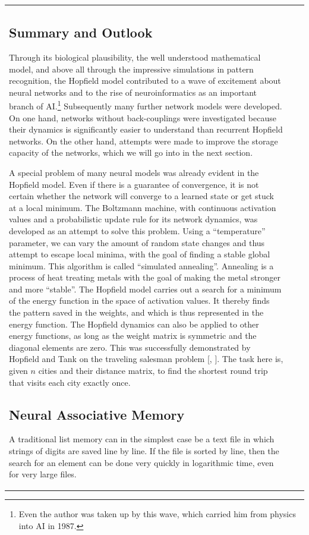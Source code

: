 \documentclass[10pt]{book}
\begin{document}
\begin{center}
\begin{tabular}{|l|l|l|}
\subsection{Summary and Outlook}
Through its biological plausibility, the well understood mathematical model, and above all through the impressive simulations in pattern recognition, the Hopfield model contributed to a wave of excitement about neural networks and to the rise of neuroinformatics as an important branch of AI.\footnote{Even the author was taken up by this wave, which carried him from physics into AI in 1987.} Subsequently many further network models were developed. On one hand, networks without back-couplings were investigated because their dynamics is significantly easier to understand than recurrent Hopfield networks. On the other hand, attempts were made to improve the storage capacity of the networks, which we will go into in the next section.

A special problem of many neural models was already evident in the Hopfield model. Even if there is a guarantee of convergence, it is not certain whether the network will converge to a learned state or get stuck at a local minimum. The Boltzmann machine, with continuous activation values and a probabilistic update rule for its network dynamics, was developed as an attempt to solve this problem. Using a ``temperature'' parameter, we can vary the amount of random state changes and thus attempt to escape local minima, with the goal of finding a stable global minimum. This algorithm is called ``simulated annealing''. Annealing is a process of heat treating metals with the goal of making the metal stronger and more ``stable''.
The Hopfield model carries out a search for a minimum of the energy function in the space of activation values. It thereby finds the pattern saved in the weights, and which is thus represented in the energy function. The Hopfield dynamics can also be applied to other energy functions, as long as the weight matrix is symmetric and the diagonal elements are zero. This was successfully demonstrated by Hopfield and Tank on the traveling salesman problem [\cite{ht85}, \cite{zel94}]. The task here is, given $n$ cities and their distance matrix, to find the shortest round trip that visits each city exactly once.

\subsection{Neural Associative Memory}
A traditional list memory can in the simplest case be a text file in which strings of digits are saved line by line. If the file is sorted by line, then the search for an element can be done very quickly in logarithmic time, even for very large files.


\end{tabular}
\end{center}
\end{document}
